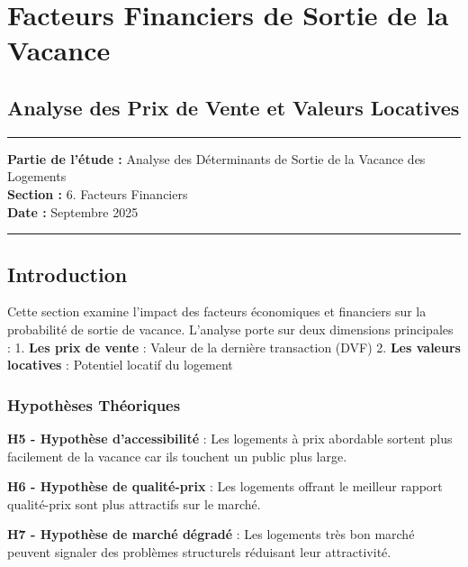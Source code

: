 \documentclass[11pt]{article}
\begin{document}
    \section{Facteurs Financiers de Sortie de la
Vacance}\label{facteurs-financiers-de-sortie-de-la-vacance}

\subsection{Analyse des Prix de Vente et Valeurs
Locatives}\label{analyse-des-prix-de-vente-et-valeurs-locatives}

\begin{center}\rule{0.5\linewidth}{0.5pt}\end{center}

\textbf{Partie de l'étude :} Analyse des Déterminants de Sortie de la
Vacance des Logements\\
\textbf{Section :} 6. Facteurs Financiers\\
\textbf{Date :} Septembre 2025

\begin{center}\rule{0.5\linewidth}{0.5pt}\end{center}

\subsection{Introduction}\label{introduction}

Cette section examine l'impact des facteurs économiques et financiers
sur la probabilité de sortie de vacance. L'analyse porte sur deux
dimensions principales : 1. \textbf{Les prix de vente} : Valeur de la
dernière transaction (DVF) 2. \textbf{Les valeurs locatives} : Potentiel
locatif du logement

\subsubsection{Hypothèses Théoriques}\label{hypothuxe8ses-thuxe9oriques}

\textbf{H5 - Hypothèse d'accessibilité} : Les logements à prix abordable
sortent plus facilement de la vacance car ils touchent un public plus
large.

\textbf{H6 - Hypothèse de qualité-prix} : Les logements offrant le
meilleur rapport qualité-prix sont plus attractifs sur le marché.

\textbf{H7 - Hypothèse de marché dégradé} : Les logements très bon
marché peuvent signaler des problèmes structurels réduisant leur
attractivité.
\end{document}
